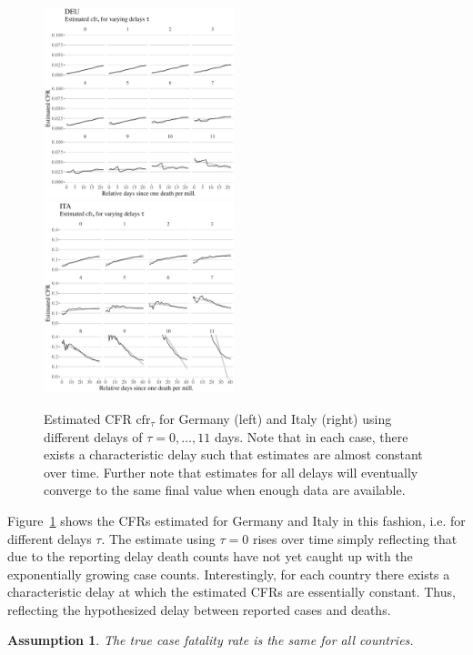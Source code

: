 \documentclass[fullpage,a4paper]{article}
\newcommand{\fig}[1]{Figure~\ref{fig:#1}}
\newtheorem{hypothesis}{Assumption}
\begin{document}
\begin{figure}
  \includegraphics[width=0.495\textwidth]{../figs/ecdc_cfr_delay_DEU.pdf}
  \includegraphics[width=0.495\textwidth]{../figs/ecdc_cfr_delay_ITA.pdf}
  \caption{\label{fig:cfr} Estimated CFR $\mathrm{cfr}_{\tau}$ for
    Germany (left) and Italy (right) using different delays of $\tau =
    0, \ldots, 11$ days. Note that in each case, there exists a
    characteristic delay such that estimates are almost constant over
    time. Further note that estimates for all delays will eventually
    converge to the same final value when enough data are available.}
\end{figure}
\fig{cfr} shows the CFRs estimated for Germany and Italy in this
fashion, i.e. for different delays $\tau$. The estimate using $\tau =
0$ rises over time simply reflecting that due to the reporting delay
death counts have not yet caught up with the exponentially growing
case counts. Interestingly, for each country there exists a
characteristic delay at which the estimated CFRs are essentially
constant. Thus, reflecting the hypothesized delay between reported
cases and deaths.

\begin{hypothesis}
  \label{hyp:cfr}
  The true case fatality rate is the same for all countries.
\end{hypothesis}
\end{document}
